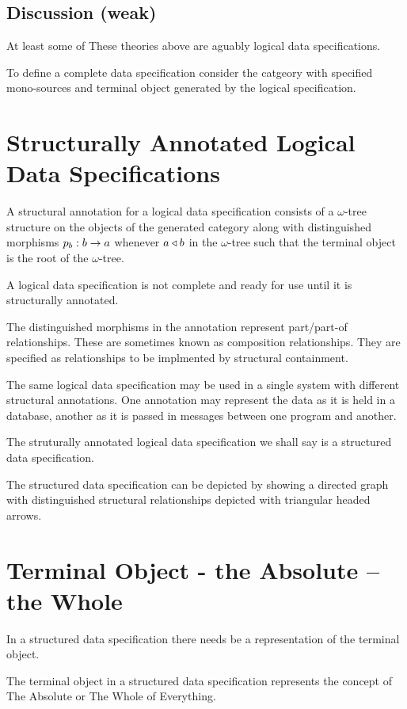 \documentclass[10pt,a4paper]{article}
\theoremstyle{remark}
\begin{document}
\begin{oldtt}
\subsection*{Discussion (weak)}
At least some of These theories above are aguably logical data specifications.

To define a complete data specification consider the catgeory with specified mono-sources
and terminal object generated by the logical specification. 
\end{oldtt}

\section{Structurally Annotated Logical Data Specifications}
A structural annotation for a logical data specification consists of a 
$\omega$-tree structure on the objects of the generated category \catcw
along with distinguished morphisms $p_b: b \rightarrow a$ whenever $a \triangleleft b$ in the  $\omega$-tree
such that the terminal object is the root of the $\omega$-tree.

A logical data specification is not complete and ready for use until it is structurally annotated.

The distinguished morphisms in the annotation represent part/part-of relationships. These are sometimes known as composition relationships. They are specified as relationships to be implmented by structural containment.

The same logical data specification may be used in a single system with different structural annotations.
One annotation may represent the data as it is held in a database, another as it is passed in messages between one program and another.

The struturally annotated logical data specification we shall say is a structured data specification.

The structured data specification  can be depicted by showing a directed graph with
distinguished structural relationships depicted with triangular headed arrows.

\section*{Terminal Object - the Absolute -- the Whole}
In a structured data specification there needs be a representation of the terminal object.

The terminal object in a structured data specification represents the concept of The Absolute or The Whole of Everything.
\end{document}
